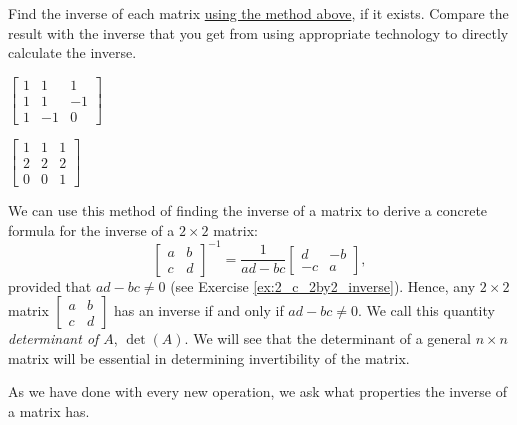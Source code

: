 \begin{activity}  \label{act:2_c_3} Find the inverse of each matrix \underline{using the method above}, if it exists. Compare the result with the inverse that you get from using appropriate technology to directly calculate the inverse. 
\ba
\item $\left[ \begin {array}{crr} 1&1&1\\ 1&1&-1\\ 1&-1&0 \end {array} \right]$



\item $\left[ \begin {array}{cccc} 1&1&1\\ 2&2&2\\ 0&0&1 \end {array} \right]$

\ea

\end{activity}



We can use this method of finding the inverse of a matrix to derive a concrete formula for the inverse of a $2 \times 2$ matrix: 
\begin{equation} \label{eq:2_c_1}
\left[ \begin{array}{cc} a&b \\ c&d \end{array} \right]^{-1} = \frac{1}{ad-bc} \left[ \begin{array}{rr} d&-b \\ -c&a \end{array} \right],
\end{equation}
provided that $ad-bc \neq 0$ (see Exercise \ref{ex:2_c_2by2_inverse}). Hence, any $2\times 2$ matrix $\left[ \begin{array}{cc} a&b \\ c&d \end{array} \right]$ has an inverse if and only if $ad-bc\neq 0$. We call this quantity \emph{determinant of $A$}, $\det(A)$. We will see that the determinant of a general $n\times n$ matrix will be essential in determining invertibility of the matrix.


\label{sec:mtx_inverse_props}

As we have done with every new operation, we ask what properties the inverse of a matrix has. 



